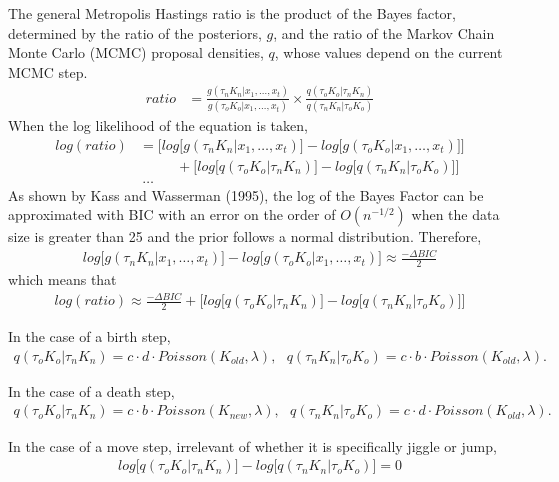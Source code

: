 \documentclass[submit]{smj}
\begin{document}
The general Metropolis Hastings ratio is the product of the Bayes factor, determined by the ratio of the posteriors, $g$, and the ratio of the Markov Chain Monte Carlo (MCMC) proposal densities, $q$, whose values depend on the current MCMC step. 
\begin{align*}
ratio &= \frac{g(\tau_{n} K_{n} | x_1,\dots,x_t) }{g(\tau_{o} K_{o} | x_1,\dots,x_t)} \times \frac{q(\tau_{o} K_{o} | \tau_{n} K_{n})}{q(\tau_{n} K_{n}| \tau_{o} K_{o})}
\end{align*}
When the log likelihood of the equation is taken, 
\begin{align*}
log(ratio) & =\Big[ log \big[ g(\tau_{n} K_{n} | x_1,\dots,x_t)
\big] - log \big[ g(\tau_{o} K_{o} | x_1,\dots,x_t)\big] \Big] \\
& \ \ \ \ \ \ \ \ \ \ \ \ + 
\Big[ log \big[ q(\tau_{o} K_{o} | \tau_{n} K_{n}) \big] - log \big[ q(\tau_{n} K_{n}| \tau_{o} K_{o})  \big] \Big] \\
& \ …
\end{align*}
As shown by Kass and Wasserman (1995), the log of the Bayes Factor can be approximated with BIC with an error on the order of $O(n^{-1/2})$ when the data size is greater than 25 and the prior follows a normal distribution.
Therefore, 
\begin{align*}
 log \big[ g(\tau_{n} K_{n} | x_1,\dots,x_t)
\big] - log \big[ g(\tau_{o} K_{o} | x_1,\dots,x_t)\big]  \approx \frac{- \Delta BIC}{2} 
\end{align*}
which means that 
\begin{align*}
log(ratio) \approx \frac{- \Delta BIC}{2} + 
\Big[ log \big[ q(\tau_{o} K_{o} | \tau_{n} K_{n}) \big] - log \big[ q(\tau_{n} K_{n}| \tau_{o} K_{o})  \big] \Big]
\end{align*}

In the case of a birth step, 
\begin{align*} 
q(\tau_{o} K_{o} | \tau_{n} K_{n}) = c \cdot d \cdot Poisson(K_{old} , \lambda), \ \ \ q(\tau_{n} K_{n} | \tau_{o} K_{o}) = c \cdot b \cdot Poisson(K_{old} , \lambda).
\end{align*}

In the case of a death step,  
\begin{align*}
q(\tau_{o} K_{o} | \tau_{n} K_{n}) = c \cdot b \cdot Poisson(K_{new} , \lambda) , \ \ \ q(\tau_{n} K_{n} | \tau_{o} K_{o}) = c \cdot d \cdot Poisson(K_{old} , \lambda).
\end{align*} 

In the case of a move step, irrelevant of whether it is specifically jiggle or jump, 
\begin{align*} 
log \big[ q(\tau_{o} K_{o} | \tau_{n} K_{n}) \big] - log \big[ q(\tau_{n} K_{n}| \tau_{o} K_{o})  \big] = 0 
\end{align*}
\end{document}

